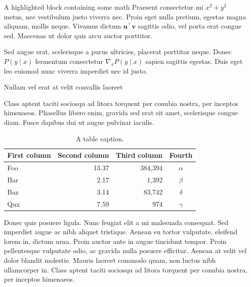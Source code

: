 \documentclass[final]{beamer}
\newlength{\colwidth}
\begin{document}
\begin{frame}[t]
\begin{columns}[t]
\begin{column}{\colwidth}
\begin{exampleblock}{A highlighted block containing some math}
    Praesent consectetur mi $x^2 + y^2$ metus, nec vestibulum justo viverra
    nec. Proin eget nulla pretium, egestas magna aliquam, mollis neque. Vivamus
    dictum $\mathbf{u}^\intercal\mathbf{v}$ sagittis odio, vel porta erat
    congue sed. Maecenas ut dolor quis arcu auctor porttitor.


    Sed augue erat, scelerisque a purus ultricies, placerat porttitor neque.
    Donec $P(y \mid x)$ fermentum consectetur $\nabla_x P(y \mid x)$ sapien
    sagittis egestas. Duis eget leo euismod nunc viverra imperdiet nec id
    justo.

  \end{exampleblock}

  \begin{block}{Nullam vel erat at velit convallis laoreet}

    Class aptent taciti sociosqu ad litora torquent per conubia nostra, per
    inceptos himenaeos. Phasellus libero enim, gravida sed erat sit amet,
    scelerisque congue diam. Fusce dapibus dui ut augue pulvinar iaculis.

    \begin{table}
      \centering
      \begin{tabular}{l r r c}
        \toprule
        \textbf{First column} & \textbf{Second column} & \textbf{Third column} & \textbf{Fourth} \\
        \midrule
        Foo & 13.37 & 384,394 & $\alpha$ \\
        Bar & 2.17 & 1,392 & $\beta$ \\
        Baz & 3.14 & 83,742 & $\delta$ \\
        Qux & 7.59 & 974 & $\gamma$ \\
        \bottomrule
      \end{tabular}
      \caption{A table caption.}
    \end{table}

    Donec quis posuere ligula. Nunc feugiat elit a mi malesuada consequat. Sed
    imperdiet augue ac nibh aliquet tristique. Aenean eu tortor vulputate,
    eleifend lorem in, dictum urna. Proin auctor ante in augue tincidunt
    tempor. Proin pellentesque vulputate odio, ac gravida nulla posuere
    efficitur. Aenean at velit vel dolor blandit molestie. Mauris laoreet
    commodo quam, non luctus nibh ullamcorper in. Class aptent taciti sociosqu
    ad litora torquent per conubia nostra, per inceptos himenaeos.




\end{block}
\end{column}
\end{columns}
\end{frame}
\end{document}

